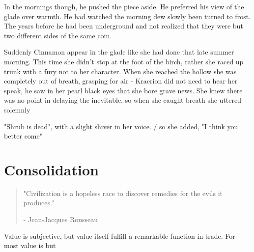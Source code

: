 \documentclass[smalldemyvopaper,11pt,twoside,onecolumn,openright,extrafontsizes]{memoir}
\begin{document}
In the mornings though, he pushed the piece aside. He preferred his view of the glade over warmth. He had watched the morning dew slowly been turned to frost. The years before he had been underground and not realized that they were but two different sides of the same coin. 

Suddenly Cinnamon appear in the glade like she had done that late summer morning. This time she didn't stop at the foot of the birch, rather she raced up trunk with a fury not to her character. When she reached the hollow she was completely out of breath, grasping for air - Kraerion did not need to hear her speak, he saw in her pearl black eyes that she bore grave news. She knew there was no point in delaying the inevitable, so when she caught breath she uttered solemnly 

"Shrub is dead", with a slight shiver in her voice. / so she added, "I think you better come" 


\chapter{Consolidation}

\vspace{-1.3cm}
\begin{localsize}{10}
	\begin{quote}
		"Civilization is a hopeless race to discover remedies for the evils it produces."
		\begin{flushright}- Jean-Jacques Rousseau\end{flushright}
	\end{quote} 
\end{localsize}
\vspace{1cm}




Value is subjective, but value itself fulfill a remarkable function in trade. For most value is but 
\end{document}
